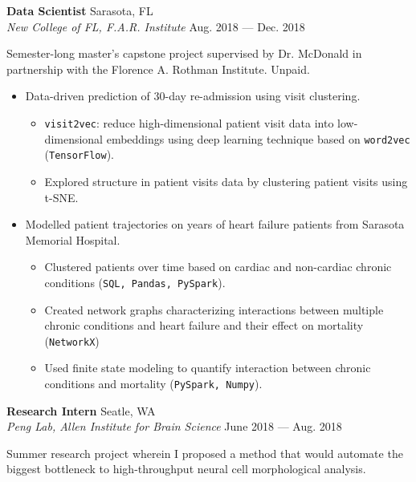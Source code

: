 \documentclass[a4paper,12pt]{article}
\newcommand{\ressubheading}[4]{{\begin{minipage}{\textwidth}
                                    \textbf{#1} \hfill #2 \\
                                    \textit{#3} \hfill #4 \\
\end{minipage}}}
\begin{document}
    \ressubheading{Data Scientist}{Sarasota, FL}{New College of FL, F.A.R. Institute}{Aug. 2018 --- Dec. 2018}

    \vspace{-6pt} Semester-long master's capstone project supervised by Dr. McDonald in partnership with the Florence A. Rothman Institute. Unpaid.


    \begin{itemize}
        \item Data-driven prediction of 30-day re-admission using visit clustering.

        \begin{itemize}
            \item \texttt{visit2vec}: reduce high-dimensional patient visit data into low-dimensional embeddings using deep learning technique based on \texttt{word2vec} (\texttt{TensorFlow}).
            \item Explored structure in patient visits data by clustering patient visits using t-SNE\@.
        \end{itemize}



        \item Modelled patient trajectories on years of heart failure patients from Sarasota Memorial Hospital.
        \begin{itemize}
            \item Clustered patients over time based on cardiac and non-cardiac chronic conditions (\texttt{SQL, Pandas, PySpark}).
            \item Created network graphs characterizing interactions between multiple chronic conditions and heart failure and their effect on mortality (\texttt{NetworkX})
            \item Used finite state modeling to quantify interaction between chronic conditions and mortality (\texttt{PySpark, Numpy}).
        \end{itemize}

    \end{itemize}

    \ressubheading{Research Intern}{Seatle, WA}{Peng Lab, Allen Institute for Brain Science}{June 2018 --- Aug. 2018}

    \vspace{-6pt} Summer research project wherein I proposed a method that would automate the biggest bottleneck to high-throughput neural cell morphological analysis.
\end{document}
